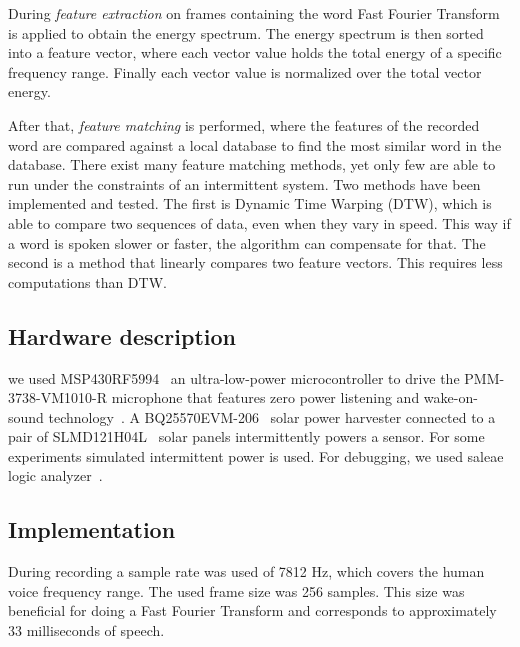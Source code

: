 
During \textit{feature extraction} on frames containing the word Fast Fourier Transform is applied to obtain the energy spectrum. 
The energy spectrum is then sorted into a feature vector, where each vector value holds the total energy of a specific frequency range. Finally each vector value is normalized over the total vector energy.

After that, \textit{feature matching} is performed, where the features of the recorded word are compared against a local database to find the most similar word in the database.
There exist many feature matching methods, yet only few are able to run under the constraints of an intermittent system.
Two methods have been implemented and tested. The first is Dynamic Time Warping (DTW), which is able to compare two sequences of data, even when they vary in speed. This way if a word is spoken slower or faster, the algorithm can compensate for that.
The second is a method that linearly compares two feature vectors. This requires less computations than DTW.

\subsection{Hardware description}
we used MSP430RF5994~\cite{ti_msp430_website} an ultra-low-power microcontroller to drive the PMM-3738-VM1010-R microphone that features zero power listening and wake-on-sound technology~\cite{microphone}. A BQ25570EVM-206~\cite{BQ25570EVM-206_website} solar power harvester connected to a pair of SLMD121H04L~\cite{SLMD121H04L_website} solar panels intermittently powers a \sys sensor. For some experiments simulated intermittent power is used. For debugging, we used saleae logic analyzer~\cite{saleae}. 

\subsection{Implementation}
During recording a sample rate was used of 7812 Hz, which covers the human voice frequency range. The used frame size was 256 samples. This size was beneficial for doing a Fast Fourier Transform and corresponds to approximately 33 milliseconds of speech.


